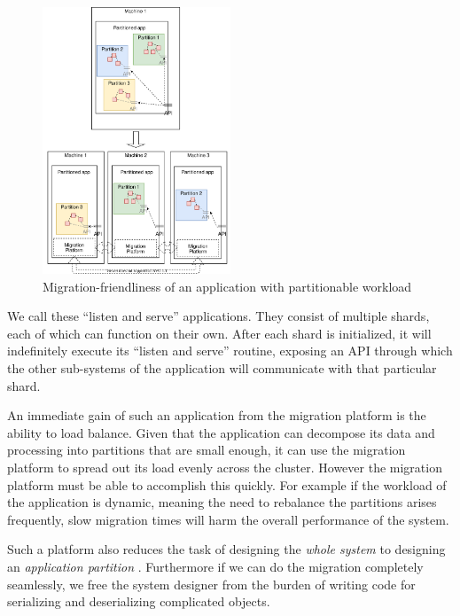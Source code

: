 \begin{figure}[t]
\centering

\includegraphics[width=0.5\textwidth]{design-goals-pluggable.drawio}
\caption{
    Migration-friendliness of an application with partitionable workload
}
\label{fig:designgoalspluggable}
\end{figure}

We call these ``listen and serve'' applications. They consist of multiple
shards, each of which can function on their own. After each shard is
initialized, it will indefinitely execute its ``listen and serve'' routine,
exposing an API through which the other sub-systems of the application
will communicate with that particular shard.

An immediate gain of such an application from the migration platform is the ability
to load balance. Given that the application can decompose its data and processing into
partitions that are small enough, it can use the migration platform to
spread out its load evenly across the cluster. However the migration platform must be
able to accomplish this quickly. For example if the workload of the application
is dynamic, meaning the need to rebalance the partitions arises frequently,
slow migration times will harm the overall performance of the system.

Such a platform also reduces the task of designing the \emph{whole system} to designing an
    \emph{application partition}
    .  Furthermore if we can do the migration completely
    seamlessly, we free the system designer from the burden of
    writing code for serializing and deserializing complicated objects.

